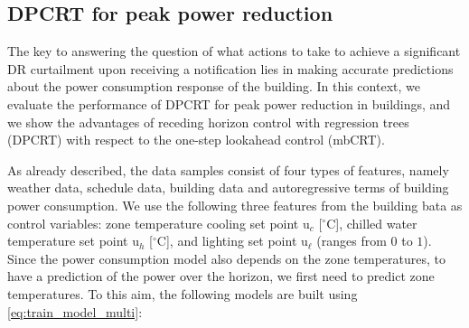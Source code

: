 \subsection{DPCRT for peak power reduction}

The key to answering the question of what actions to take to achieve a significant DR curtailment upon receiving a notification lies in making accurate predictions about the power consumption response of the building. 
In this context, we evaluate the performance of DPCRT for peak power reduction in buildings, and we show the advantages of receding horizon control with regression trees (DPCRT) with respect to the one-step lookahead control (mbCRT). 

As already described, the data samples consist of four types of features, namely weather data, schedule data, building data and autoregressive terms of building power consumption. 
We use the following three features from the building bata as control variables: zone temperature cooling set point $\mathrm{u}_c$ [$^{\circ}$C], chilled water temperature set point $\mathrm{u}_h$ [$^{\circ}$C], and lighting set point $\mathrm{u}_\ell$ (ranges from $0$ to $1$). Since the power consumption model also depends on the zone temperatures, to have a prediction of the power over the horizon, we first need to predict zone temperatures. To this aim, the following models are built using \eqref{eq:train_model_multi}:
